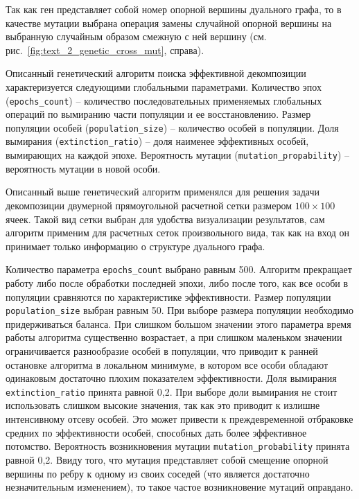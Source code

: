 Так как ген представляет собой номер опорной вершины дуального графа, то в качестве мутации выбрана операция замены случайной опорной вершины на выбранную случайным образом смежную с ней вершину (см. рис.~\ref{fig:text_2_genetic_cross_mut}, справа).

Описанный генетический алгоритм поиска эффективной декомпозиции характеризуется следующими глобальными параметрами.
Количество эпох (\texttt{epochs\_count}) -- количество последовательных применяемых глобальных операций по вымиранию части популяции и ее восстановлению.
Размер популяции особей (\texttt{population\_size}) -- количество особей в популяции.
Доля вымирания (\texttt{extinction\_ratio}) – доля наименее эффективных особей, вымирающих на каждой эпохе.
Вероятность мутации (\texttt{mutation\_propability}) -- вероятность мутации в новой особи.

Описанный выше генетический алгоритм применялся для решения задачи декомпозиции двумерной прямоугольной расчетной сетки размером $100 \times 100$ ячеек.
Такой вид сетки выбран для удобства визуализации результатов, сам алгоритм применим для расчетных сеток произвольного вида, так как на вход он принимает только информацию о структуре дуального графа.

Количество параметра \texttt{epochs\_count} выбрано равным 500.
Алгоритм прекращает работу либо после обработки последней эпохи, либо после того, как все особи в популяции сравняются по характеристике эффективности.
Размер популяции \texttt{population\_size} выбран равным 50.
При выборе размера популяции необходимо придерживаться баланса.
При слишком большом значении этого параметра время работы алгоритма существенно возрастает, а при слишком маленьком значении ограничивается разнообразие особей в популяции, что приводит к ранней остановке алгоритма в локальном минимуме, в котором все особи обладают одинаковым достаточно плохим показателем эффективности.
Доля вымирания \texttt{extinction\_ratio} принята равной 0,2.
При выборе доли вымирания не стоит использовать слишком высокие значения, так как это приводит к излишне интенсивному отсеву особей.
Это может привести к преждевременной отбраковке средних по эффективности особей, способных дать более эффективное потомство.
Вероятность возникновения мутации \texttt{mutation\_probability} принята равной 0,2.
Ввиду того, что мутация представляет собой смещение опорной вершины по ребру к одному из своих соседей (что является достаточно незначительным изменением), то такое частое возникновение мутаций оправдано.

